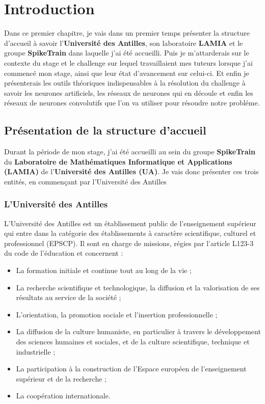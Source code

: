 \hypertarget{Introduction}{%
\chapter{Introduction}\label{Introduction}}

Dans ce premier chapitre, je vais dans un premier temps présenter la structure d'accueil à savoir l'\textbf{Université des Antilles}, son laboratoire \textbf{LAMIA} et le groupe \textbf{SpikeTrain} dans laquelle j'ai été accueilli. Puis je m'attarderais sur le contexte du stage et le challenge sur lequel travaillaient mes tuteurs lorsque j'ai commencé mon stage, ainsi que leur état d'avancement sur celui-ci. Et enfin je présenterais les outils théoriques indispensables à la résolution du challenge à savoir les neurones artificiels, les réseaux de neurones qui en découle et enfin les réseaux de neurones convolutifs que l'on va utiliser pour résoudre notre probléme.

\section{Présentation de la structure
d'accueil}

Durant la période de mon stage, j'ai été accueilli au sein du groupe \textbf{SpikeTrain} du
\textbf{Laboratoire de Mathématiques Informatique et Applications
(LAMIA)} de l'\textbf{Université des Antilles (UA)}.
Je vais donc présenter ces trois entités, en commençant par l'Université des Antilles

\hypertarget{lUniversite-des-antilles}{%
\subsection{L'Université des Antilles}\label{luniversite-des-antilles}}

L'Université des Antilles est un établissement public de l'enseignement supérieur qui entre dans la catégorie des établissements à  caractère scientifique, culturel et professionnel (EPSCP).
Il sont en charge de missions, régies par l'article L123-3 du code de l'éducation et concernent :
\begin{itemize}
\item La formation initiale et continue tout au long de la vie ;
\item La recherche scientifique et technologique, la diffusion et la valorisation de ses résultats au service de la société ;
\item L’orientation, la promotion sociale et l’insertion professionnelle ;
\item La diffusion de la culture humaniste, en particulier à travers le développement des sciences humaines et sociales, et de la culture scientifique, technique et industrielle ;
\item La participation à la construction de l’Espace européen de l’enseignement supérieur et de la recherche ;
\item La coopération internationale.
\end{itemize}

